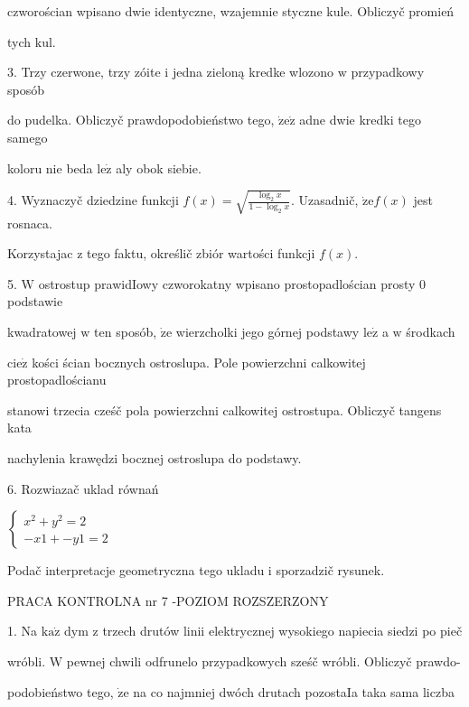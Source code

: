 \documentclass[a4paper,12pt]{article}
\begin{document}
czworościan wpisano dwie identyczne, wzajemnie styczne kule. Obliczyč promień

tych $\mathrm{k}\mathrm{u}\mathrm{l}.$

3. Trzy czerwone, trzy zóite $\mathrm{i}$ jedna zieloną kredke wlozono $\mathrm{w}$ przypadkowy sposób

do pudelka. Obliczyč prawdopodobieństwo tego, $\dot{\mathrm{z}}\mathrm{e}\dot{\mathrm{z}}$ adne dwie kredki tego samego

koloru nie beda $\mathrm{l}\mathrm{e}\dot{\mathrm{z}}$ aly obok siebie.

4. Wyznaczyč dziedzine funkcji $f(x)=\sqrt{\frac{\log_{2}x}{1-\log_{2}x}}$. Uzasadnič, $\dot{\mathrm{z}}\mathrm{e}f(x)$ jest rosnaca.

Korzystajac $\mathrm{z}$ tego faktu, określič zbiór wartości funkcji $f(x).$

5. $\mathrm{W}$ ostrostup prawidIowy czworokatny wpisano prostopadlościan prosty $0$ podstawie

kwadratowej $\mathrm{w}$ ten sposób, $\dot{\mathrm{z}}\mathrm{e}$ wierzcholki jego górnej podstawy $\mathrm{l}\mathrm{e}\dot{\mathrm{z}}$ a $\mathrm{w}$ środkach

$\mathrm{c}\mathrm{i}\mathrm{e}\dot{\mathrm{z}}$ kości ścian bocznych ostroslupa. Pole powierzchni calkowitej prostopadlościanu

stanowi trzecia cześč pola powierzchni calkowitej ostrostupa. Obliczyč tangens kata

nachylenia krawędzi bocznej ostroslupa do podstawy.

6. Rozwiazač uklad równań

$\left\{\begin{array}{l}
x^{2}+y^{2}=2\\
- x1+-y1=2
\end{array}\right.$

Podač interpretacje geometryczna tego ukladu i sporzadzič rysunek.




PRACA KONTROLNA nr 7 -POZIOM ROZSZERZONY

1. Na $\mathrm{k}\mathrm{a}\dot{\mathrm{z}}$ dym $\mathrm{z}$ trzech drutów linii elektrycznej wysokiego napiecia siedzi po pieč

wróbli. $\mathrm{W}$ pewnej chwili odfrunelo przypadkowych sześč wróbli. Obliczyč prawdo-

podobieństwo tego, $\dot{\mathrm{z}}\mathrm{e}$ na co najmniej dwóch drutach pozostaIa taka sama liczba
\end{document}
